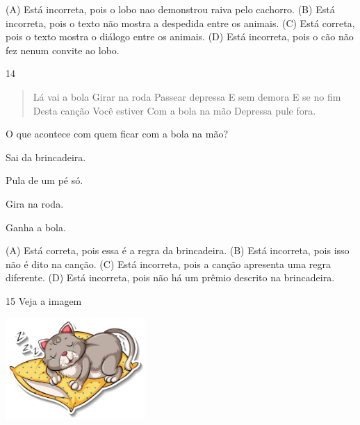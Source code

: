
(A) Está incorreta, pois o lobo nao demonstrou raiva pelo cachorro.
(B) Está incorreta, pois o texto não mostra a despedida entre os animais.
(C) Está correta, pois o texto mostra o diálogo entre os animais.
(D) Está incorreta, pois o cão não fez nenum convite ao lobo.

\num{14}

\begin{verse}
Lá vai a bola
Girar na roda
Passear depressa
E sem demora
E se no fim
Desta canção
Você estiver
Com a bola na mão
Depressa pule fora.
\end{verse}


O que acontece com quem ficar com a bola na mão?

\begin{escolha}
\item Sai da brincadeira.

\item Pula de um pé só.

\item Gira na roda.

\item Ganha a bola.
\end{escolha}


(A) Está correta, pois essa é a regra da brincadeira.
(B) Está incorreta, pois isso não é dito na canção.
(C) Está incorreta, pois a canção apresenta uma regra diferente.
(D) Está incorreta, pois não há um prêmio descrito na brincadeira.

\num{15} Veja a imagem

\includegraphics[width=2.09091in,height=1.52916in]{media/image161.jpeg}



